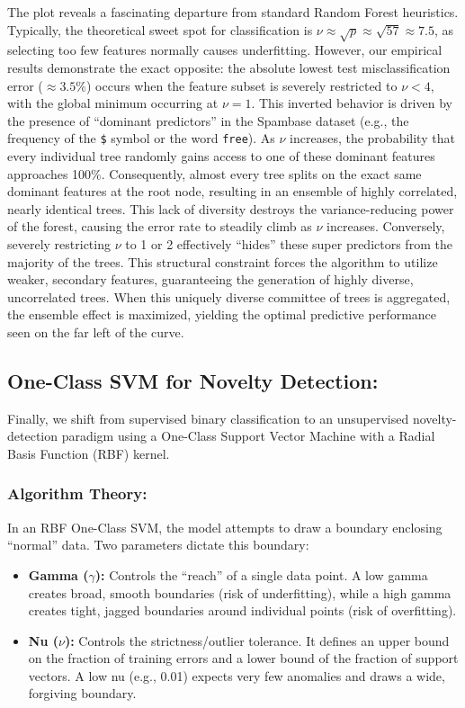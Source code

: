 \documentclass[twoside, 10pt]{article}
\begin{document}
The plot reveals a fascinating departure from standard Random Forest heuristics. Typically, the theoretical sweet spot for classification is $\nu \approx \sqrt{p} \approx \sqrt{57} \approx 7.5$, as selecting too few features normally causes underfitting. However, our empirical results demonstrate the exact opposite: the absolute lowest test misclassification error ($\approx 3.5\%$) occurs when the feature subset is severely restricted to $\nu < 4$, with the global minimum occurring at $\nu = 1$. 
This inverted behavior is driven by the presence of ``dominant predictors'' in the Spambase dataset (e.g., the frequency of the \texttt{\$} symbol or the word \texttt{free}). As $\nu$ increases, the probability that every individual tree randomly gains access to one of these dominant features approaches 100\%. Consequently, almost every tree splits on the exact same dominant features at the root node, resulting in an ensemble of highly correlated, nearly identical trees. This lack of diversity destroys the variance-reducing power of the forest, causing the error rate to steadily climb as $\nu$ increases. 
Conversely, severely restricting $\nu$ to 1 or 2 effectively ``hides'' these super predictors from the majority of the trees. This structural constraint forces the algorithm to utilize weaker, secondary features, guaranteeing the generation of highly diverse, uncorrelated trees. When this uniquely diverse committee of trees is aggregated, the ensemble effect is maximized, yielding the optimal predictive performance seen on the far left of the curve.
\subsection{One-Class SVM for Novelty Detection:}
Finally, we shift from supervised binary classification to an unsupervised novelty-detection paradigm using a One-Class Support Vector Machine with a Radial Basis Function (RBF) kernel. 
\subsubsection{Algorithm Theory:}
In an RBF One-Class SVM, the model attempts to draw a boundary enclosing ``normal'' data. Two parameters dictate this boundary:
\begin{itemize}
    \item \textbf{Gamma ($\gamma$):} Controls the ``reach'' of a single data point. A low gamma creates broad, smooth boundaries (risk of underfitting), while a high gamma creates tight, jagged boundaries around individual points (risk of overfitting).
    \item \textbf{Nu ($\nu$):} Controls the strictness/outlier tolerance. It defines an upper bound on the fraction of training errors and a lower bound of the fraction of support vectors. A low nu (e.g., 0.01) expects very few anomalies and draws a wide, forgiving boundary.
\end{itemize}
\end{document}
